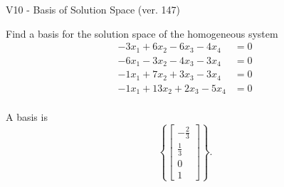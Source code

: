 \begin{exercise}
  \begin{exerciseTitle}V10 - Basis of Solution Space (ver. 147)\end{exerciseTitle}
  \begin{exerciseStatement}
    Find a basis for the solution space of the homogeneous system 
\begin{align*}
 -3 x_ 1 + 6 x_ 2 -6 x_ 3 -4 x_ 4 &= 0  \\ 
  -6 x_ 1 -3 x_ 2 -4 x_ 3 -3 x_ 4 &= 0  \\ 
  -1 x_ 1 + 7 x_ 2 + 3 x_ 3 -3 x_ 4 &= 0  \\ 
  -1 x_ 1 + 13 x_ 2 + 2 x_ 3 -5 x_ 4 &= 0  \\ 
 \end{align*}


 
  \end{exerciseStatement}

  \begin{exerciseAnswer}
   A basis is   
\[\left\{\left[\begin{array}{c}
-\frac{2}{3} \\
\frac{1}{3} \\
0 \\
1
\end{array}\right]\right\}.\]

  


  \end{exerciseAnswer}
\end{exercise}